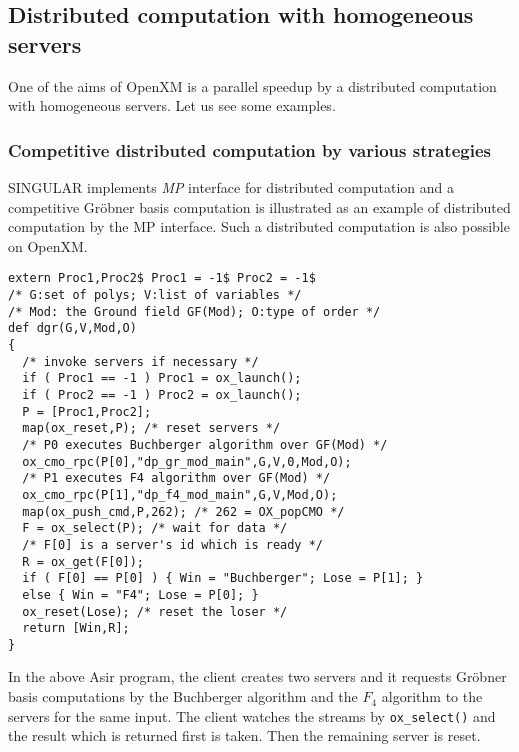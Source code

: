 
\subsection{Distributed computation with homogeneous servers}
\label{section:homog}

One of the aims of OpenXM is a parallel speedup by a distributed computation
with homogeneous servers.  Let us see some examples.

\subsubsection{Competitive distributed computation by various strategies}

SINGULAR \cite{Singular} implements {\it MP} interface for distributed
computation and a competitive Gr\"obner basis computation is
illustrated as an example of distributed computation by the MP interface.
Such a distributed computation is also possible on OpenXM.

\begin{verbatim}
extern Proc1,Proc2$ Proc1 = -1$ Proc2 = -1$
/* G:set of polys; V:list of variables */
/* Mod: the Ground field GF(Mod); O:type of order */
def dgr(G,V,Mod,O)
{
  /* invoke servers if necessary */
  if ( Proc1 == -1 ) Proc1 = ox_launch();
  if ( Proc2 == -1 ) Proc2 = ox_launch();
  P = [Proc1,Proc2];
  map(ox_reset,P); /* reset servers */
  /* P0 executes Buchberger algorithm over GF(Mod) */
  ox_cmo_rpc(P[0],"dp_gr_mod_main",G,V,0,Mod,O);
  /* P1 executes F4 algorithm over GF(Mod) */
  ox_cmo_rpc(P[1],"dp_f4_mod_main",G,V,Mod,O);
  map(ox_push_cmd,P,262); /* 262 = OX_popCMO */
  F = ox_select(P); /* wait for data */
  /* F[0] is a server's id which is ready */
  R = ox_get(F[0]);
  if ( F[0] == P[0] ) { Win = "Buchberger"; Lose = P[1]; }
  else { Win = "F4"; Lose = P[0]; }
  ox_reset(Lose); /* reset the loser */
  return [Win,R];
}
\end{verbatim}
In the above Asir program, the client creates two servers and it requests 
Gr\"obner basis computations by the Buchberger algorithm 
and the $F_4$ algorithm to the servers for the same input.
The client watches the streams by {\tt ox\_select()}
and the result which is returned first is taken. Then the remaining
server is reset.


